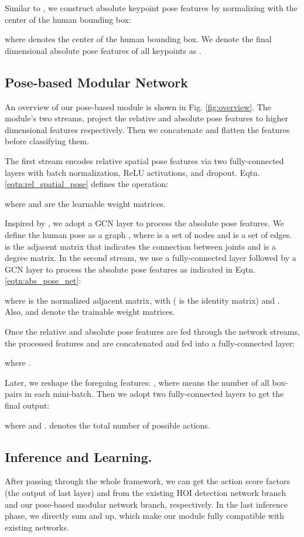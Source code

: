 \documentclass[10pt,twocolumn,letterpaper]{article}
\begin{document}
Similar to \cite{gupta2018nofrills}, we construct absolute keypoint pose features  by normalizing with the center of the human bounding box:

where  denotes the center of the human bounding box. We denote the final  dimensional absolute pose features of all keypoints as .
\subsection{Pose-based Modular Network} \label{subsec:PMN}
An overview of our pose-based module is shown in Fig. \ref{fig:overview}. The module's two streams, project the relative and absolute pose features to higher dimensional features respectively. Then we concatenate and flatten the features before classifying them.

The first stream encodes relative spatial pose features via two fully-connected layers with batch normalization, ReLU activations, and dropout. Eqtn. \ref{eqtn:rel_spatial_pose} defines the operation:

where  and  are the learnable weight matrices.

Inspired by \cite{liu2020gastnet, Zhao_2019}, we adopt a GCN \cite{kipf2016semisupervised} layer to process the absolute pose features. We define the human pose as a graph , where  is a set of  nodes and  is a set of  edges.  is the adjacent matrix that indicates the connection between joints and  is a degree matrix. In the second stream, we use a fully-connected layer followed by a GCN layer to process the absolute pose features as indicated in Eqtn. \ref{eqtn:abs_pose_net}:

where  is the normalized adjacent matrix, with  ( is the identity matrix) and  \cite{kipf2016semisupervised}. Also,  and  denote the trainable weight matrices.
 
Once the relative and absolute pose features are fed through the network streams, the processed features  and  are concatenated and fed into a fully-connected layer:

where .

Later, we reshape the foregoing features:   , where  means the number of all box-pairs in each mini-batch. Then we adopt two fully-connected layers to get the final output:

where  and .  denotes the total number of possible actions.

\subsection{Inference and Learning.}\label{subsec:inference}
After passing through the whole framework, we can get the action score factors (the output of last layer)  and  from the existing HOI detection network branch and our pose-based modular network branch, respectively. In the last inference phase, we directly sum  and  up, which make our module fully compatible with existing networks. 
\end{document}
